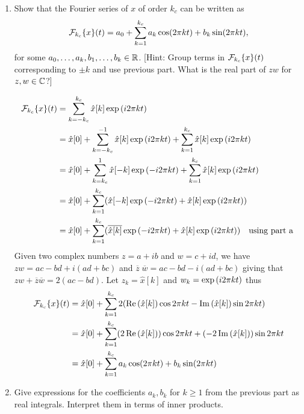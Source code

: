 \documentclass[12pt,twoside]{article}
\begin{document}
\begin{enumerate}
\begin{enumerate}
    
  \item Show that the Fourier series of $x$ of order $k_c$ can be written as
    $$\mathcal{ F }_{k_c}\{x\}(t) = a_0 + \sum_{k=1}^{k_c} a_k\cos(2\pi
    kt)+b_k\sin(2\pi kt),$$
    for some $a_0,\ldots,a_k,b_1,\ldots,b_k\in\mathbb{R}$. [Hint: Group terms
      in $\mathcal{ F }_{k_c}\{x\}(t)$ corresponding to $\pm k$ and use previous
      part.  What is the real part of $zw$ for $z,w\in\mathbb{C} $?]
      
    \begin{align*}
		\mathcal{ F }_{k_c}\{x\}(t) 	&=	\sum_{k=-k_c}^{k_c} \hat{x}[k] \exp \left( i 2 \pi k t \right) \\
						&= 	\hat{x}[0] +  \sum_{k=-k_c}^{-1} \hat{x}[k] \exp \left( i 2 \pi k t \right) + \sum_{k=1}^{k_c} \hat{x}[k] \exp \left( i 2 \pi k t \right) \\
						&= 	\hat{x}[0] +  \sum_{k=k_c}^{1} \hat{x}[-k] \exp \left( - i 2 \pi k t \right) + \sum_{k=1}^{k_c} \hat{x}[k] \exp \left( i 2 \pi k t \right) \\
						&=	\hat{x}[0] +   \sum_{k=1}^{k_c} (\hat{x}[-k] \exp \left( - i 2 \pi k t \right) +  \hat{x}[k] \exp \left( i 2 \pi k t \right) ) \\
						&=	\hat{x}[0] +   \sum_{k=1}^{k_c} (\overline{ \hat{x}[k] } \exp \left( - i 2 \pi k t \right) +  \hat{x}[k] \exp \left( i 2 \pi k t \right) ) \text{ ~ using part a } \\
   \end{align*}
Given two complex numbers $z = a + i b$ and $w = c + id$, we have $zw = ac - bd + i (ad + bc)$ and $\overline{z} \; \overline{w} = ac - bd - i (ad + bc)$ giving that $z w + \overline{z} \overline{w} = 2 (ac - bd)$.
Let  $z_k = \hat{x}[k]$ and $w_k =     \exp \left( i 2 \pi k t \right) $ thus
   \begin{align*}
   	\mathcal{ F }_{k_c}\{x\}(t) 		&=  \hat{x}[0] +  \sum_{k=1}^{k_c} 2 (\operatorname{Re}\left(   \hat{x}[k]  \right) \cos{ 2 \pi k t} - \operatorname{Im}\left(  \hat{x}[k]   \right)  \sin{ 2 \pi k t} ) \\
						&= \hat{x}[0] +  \sum_{k=1}^{k_c} (2 \operatorname{Re}\left(   \hat{x}[k]  \right)) \cos{ 2 \pi k t} + (-2  \operatorname{Im}\left(  \hat{x}[k]   \right) ) \sin{ 2 \pi k t}  \\
						&= \hat{x}[0] +   \sum_{k=1}^{k_c} a_k \cos(2\pi k t) + b_k \sin(2\pi k t) \\
   \end{align*}
   
  \item Give
    expressions for the coefficients $a_k,b_k$ for $k\geq 1$ from the
    previous part as real integrals. Interpret them in terms of inner products.
    

\end{enumerate}
\end{enumerate}
\end{document}
